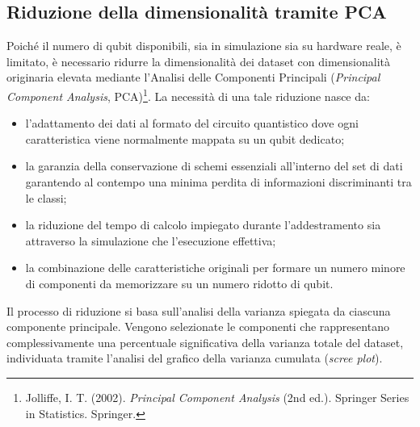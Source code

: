 \subsection{Riduzione della dimensionalità tramite PCA}
\label{sec:pca}
Poiché il numero di qubit disponibili, sia in simulazione sia su hardware reale, è limitato, è necessario ridurre la dimensionalità dei dataset con dimensionalità originaria elevata mediante l'Analisi delle Componenti Principali (\textit{Principal Component Analysis}, PCA)\footnote{Jolliffe, I. T. (2002). \textit{Principal Component Analysis} (2nd ed.). Springer Series in Statistics. Springer.}.
La necessità di una tale riduzione nasce da:
\begin{itemize}
    \item l'adattamento dei dati al formato del circuito quantistico dove ogni caratteristica viene normalmente mappata su un qubit dedicato;
    \item la garanzia della conservazione di schemi essenziali all'interno del set di dati garantendo al contempo una minima perdita di informazioni discriminanti tra le classi;
    \item la riduzione del tempo di calcolo impiegato durante l'addestramento sia attraverso la simulazione che l'esecuzione effettiva;
    \item la combinazione delle caratteristiche originali per formare un numero minore di componenti da memorizzare su un numero ridotto di qubit.
\end{itemize}

Il processo di riduzione si basa sull'analisi della varianza spiegata da ciascuna componente principale.
Vengono selezionate le componenti che rappresentano complessivamente una percentuale significativa della varianza totale del dataset, individuata tramite l'analisi del grafico della varianza cumulata (\textit{scree plot}).

